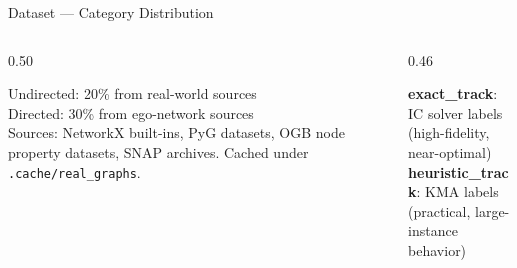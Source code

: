 \documentclass[aspectratio=169,10pt]{beamer}
\renewcommand{\footnotesize}{\tiny}
\begin{document}
\begin{frame}{Dataset — Category Distribution}
\begin{columns}[T]
\begin{column}{0.50\textwidth}
\begin{tcolorbox}[greenbox,fontupper=\footnotesize]
        Undirected: 20\% from real-world sources\\
        Directed: 30\% from ego-network sources\\[3pt]
        Sources: NetworkX built-ins, PyG datasets,
        OGB node property datasets, SNAP archives.
        Cached under \texttt{.cache/real\_graphs}.
      \end{tcolorbox}
    \end{column}
    \begin{column}{0.46\textwidth}
      \begin{tcolorbox}[algbox,title=Label Sources]
        \footnotesize
        \textbf{exact\_track}: IC solver labels\\
        (high-fidelity, near-optimal)\\[3pt]
        \textbf{heuristic\_track}: KMA labels\\
        (practical, large-instance behavior)
      \end{tcolorbox}
    \end{column}
  \end{columns}
\end{frame}
\end{document}
